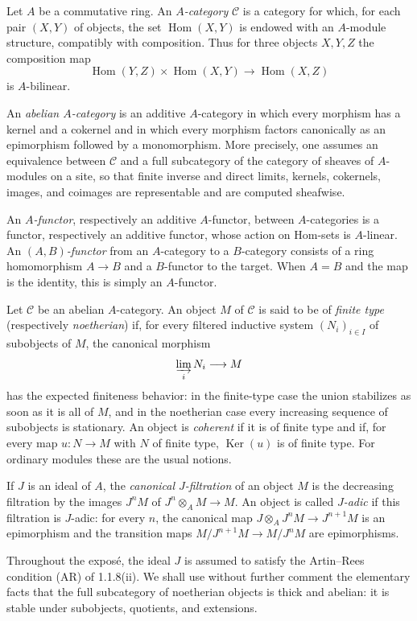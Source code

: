 \documentclass[12pt]{article}
\newcommand{\cC}{\mathcal C}
\newcommand{\Hom}{\operatorname{Hom}}
\newcommand{\Ker}{\operatorname{Ker}}
\begin{document}
Let $A$ be a commutative ring. An \emph{$A$-category} $\cC$ is a category for which,
for each pair $(X,Y)$ of objects, the set $\Hom(X,Y)$ is endowed with an
$A$-module structure, compatibly with composition. Thus for three objects
$X,Y,Z$ the composition map
\[
       \Hom(Y,Z)\times\Hom(X,Y)\longrightarrow\Hom(X,Z)
\]
is $A$-bilinear.

An \emph{abelian $A$-category} is an additive $A$-category in which every morphism
has a kernel and a cokernel and in which every morphism factors canonically as an
epimorphism followed by a monomorphism. More precisely, one assumes an equivalence
between $\cC$ and a full subcategory of the category of sheaves of $A$-modules on a
site, so that finite inverse and direct limits, kernels, cokernels, images, and
coimages are representable and are computed sheafwise.

An \emph{$A$-functor}, respectively an additive $A$-functor, between $A$-categories
is a functor, respectively an additive functor, whose action on Hom-sets is
$A$-linear. An \emph{$(A,B)$-functor} from an $A$-category to a $B$-category consists
of a ring homomorphism $A\to B$ and a $B$-functor to the target. When $A=B$ and the
map is the identity, this is simply an $A$-functor.

Let $\cC$ be an abelian $A$-category. An object $M$ of $\cC$ is said to be of
\emph{finite type} (respectively \emph{noetherian}) if, for every filtered inductive
system $(N_i)_{i\in I}$ of subobjects of $M$, the canonical morphism
\[
       \varinjlim_i N_i\longrightarrow M
\]
has the expected finiteness behavior: in the finite-type case the union stabilizes
as soon as it is all of $M$, and in the noetherian case every increasing sequence of
subobjects is stationary. An object is \emph{coherent} if it is of finite type and if,
for every map $u:N\to M$ with $N$ of finite type, $\Ker(u)$ is of finite type. For
ordinary modules these are the usual notions.

If $J$ is an ideal of $A$, the \emph{canonical $J$-filtration} of an object $M$ is the
decreasing filtration by the images $J^nM$ of
$J^n\otimes_A M\to M$. An object is called \emph{$J$-adic} if this filtration is
$J$-adic: for every $n$, the canonical map
$J\otimes_A J^nM\to J^{n+1}M$ is an epimorphism and the transition maps
$M/J^{n+1}M\to M/J^nM$ are epimorphisms.

Throughout the exposé, the ideal $J$ is assumed to satisfy the Artin--Rees condition
(AR) of 1.1.8(ii). We shall use without further comment the elementary facts that
the full subcategory of noetherian objects is thick and abelian: it is stable under
subobjects, quotients, and extensions.
\end{document}
